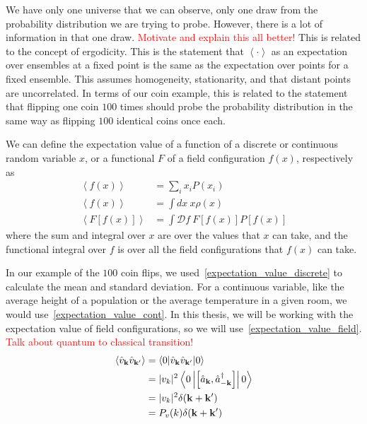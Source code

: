     
    We have only one universe that we can observe, only one draw from the probability distribution
    we are trying to probe. However, there is a lot of information in that one draw.
    \textcolor{red}{Motivate and explain this all better!} This is related to the concept
    of ergodicity. This is the statement that $\left<\cdot\right>$ as an expectation over ensembles
    at a fixed point is the same as the expectation over points for a fixed ensemble.
    This assumes homogeneity, stationarity, and that distant points are uncorrelated.
    In terms of our coin example, this is related to the statement that flipping one coin
    $100$ times should probe the probability distribution in the same way as flipping
    $100$ identical coins once each.


    We can define the expectation value of a function of a discrete or
    continuous random variable $x$, or a functional $F$ of a field configuration $f(x)$, respectively as
    \begin{align}
        \left<f(x)\right> &= \sum_i x_i P(x_i)\label{expectation_value_discrete}\\
        \left<f(x)\right> &= \int dx~x \rho(x)\label{expectation_value_cont}\\
        \left<F\left[f(x)\right]\right> &= \int \mathcal{D}f~F\left[f(x)\right] P\left[f(x)\right]\label{expectation_value_field}
    \end{align}
    where the sum and integral over $x$ are over the values that $x$ can take,
    and the functional integral over $f$ is over all the field configurations
    that $f(x)$ can take.


    In our example of the $100$ coin flips, we used~\eqref{expectation_value_discrete}
    to calculate the mean and standard deviation. For a continuous variable,
    like the average height of a population or the average temperature in a given room,
    we would use~\eqref{expectation_value_cont}. In this thesis, we will be working with
    the expectation value of field configurations, so we will use~\eqref{expectation_value_field}.
    \textcolor{red}{Talk about quantum to classical transition!}
    \begin{align}
        \left<\hat{v}_{\mathbf{k}}\hat{v}_{\mathbf{k}'}\right>
                         &= \left<0|\hat{v}_{\mathbf{k}}\hat{v}_{\mathbf{k}'}|0\right>\\
                         &= |v_k|^2\left<0\left|\left[\hat{a}_{\mathbf{k}},\hat{a}_{-\mathbf{k}}^{\dagger}\right]\right|0\right>\\
                         &= |v_k|^2\delta(\mathbf{k}+\mathbf{k}')\\
                         &= P_{v}(k)\delta(\mathbf{k}+\mathbf{k}')
    \end{align}


